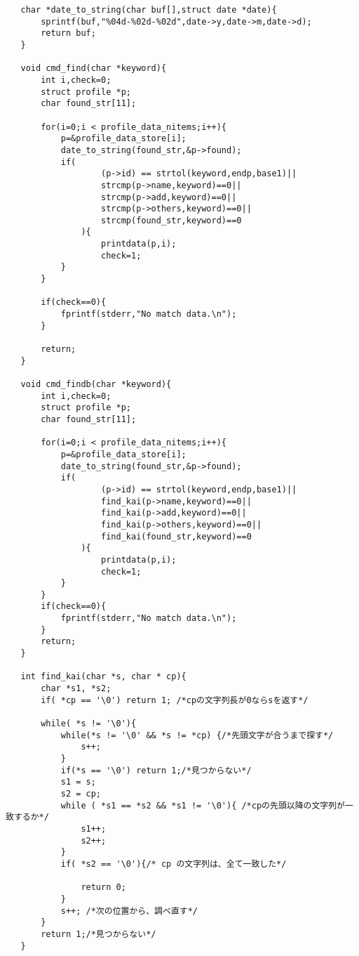 \documentclass[a4j,11pt]{jarticle}
\begin{document}
\begin{lstlisting}
   char *date_to_string(char buf[],struct date *date){
       sprintf(buf,"%04d-%02d-%02d",date->y,date->m,date->d);
       return buf;
   }
   
   void cmd_find(char *keyword){
       int i,check=0;
       struct profile *p;
       char found_str[11];
       
       for(i=0;i < profile_data_nitems;i++){
           p=&profile_data_store[i];
           date_to_string(found_str,&p->found);
           if( 
                   (p->id) == strtol(keyword,endp,base1)||
                   strcmp(p->name,keyword)==0||
                   strcmp(p->add,keyword)==0||
                   strcmp(p->others,keyword)==0||
                   strcmp(found_str,keyword)==0
               ){
                   printdata(p,i);
                   check=1;
           }
       }
       
       if(check==0){
           fprintf(stderr,"No match data.\n");
       }
       
       return;
   }
   
   void cmd_findb(char *keyword){
       int i,check=0;
       struct profile *p;
       char found_str[11];
       
       for(i=0;i < profile_data_nitems;i++){
           p=&profile_data_store[i];
           date_to_string(found_str,&p->found);
           if( 
                   (p->id) == strtol(keyword,endp,base1)||
                   find_kai(p->name,keyword)==0||
                   find_kai(p->add,keyword)==0||
                   find_kai(p->others,keyword)==0||
                   find_kai(found_str,keyword)==0
               ){
                   printdata(p,i);
                   check=1;
           }
       }
       if(check==0){
           fprintf(stderr,"No match data.\n");
       }
       return;
   }
   
   int find_kai(char *s, char * cp){
       char *s1, *s2;
       if( *cp == '\0') return 1; /*cpの文字列長が0ならsを返す*/ 
   
       while( *s != '\0'){
           while(*s != '\0' && *s != *cp) {/*先頭文字が合うまで探す*/
               s++;
           }
           if(*s == '\0') return 1;/*見つからない*/
           s1 = s;
           s2 = cp;
           while ( *s1 == *s2 && *s1 != '\0'){ /*cpの先頭以降の文字列が一致するか*/
               s1++;
               s2++;
           }
           if( *s2 == '\0'){/* cp の文字列は、全て一致した*/
       
               return 0;
           }
           s++; /*次の位置から、調べ直す*/
       }
       return 1;/*見つからない*/
   }
   

\end{lstlisting}
\end{document}
